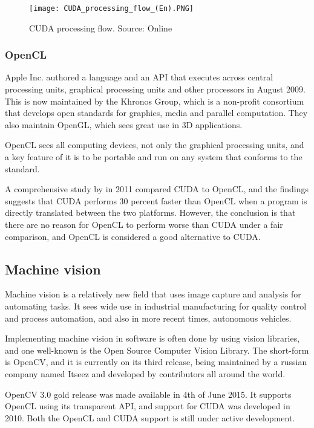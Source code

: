 \begin{figure}[ht]
    \centering
    \texttt{[image: CUDA\_processing\_flow\_(En).PNG]}
    \caption{CUDA processing flow. Source: Online \citet{wikicuda15}}
    \label{fig:CUDA_processing_flow_(En)}
\end{figure}
\FloatBarrier

\subsubsection{OpenCL}
Apple Inc. authored a language and an API that executes across central processing units, graphical processing units and other processors in August 2009. This is now maintained by the Khronos Group, which is a non-profit consortium that develops open standards for graphics, media and parallel computation. They also maintain OpenGL, which sees great use in 3D applications.

OpenCL sees all computing devices, not only the graphical processing units, and a key feature of it is to be portable and run on any system that conforms to the standard.

A comprehensive study by \citep{fang11} in 2011 compared CUDA to OpenCL, and the findings suggests that CUDA performs 30 percent faster than OpenCL when a program is directly translated between the two platforms. However, the conclusion is that there are no reason for OpenCL to perform worse than CUDA under a fair comparison, and OpenCL is considered a good alternative to CUDA.

\subsection{Machine vision}
Machine vision is a relatively new field that uses image capture and analysis for automating tasks. It sees wide use in industrial manufacturing for quality control and process automation, and also in more recent times, autonomous vehicles.

Implementing machine vision in software is often done by using vision libraries, and one well-known is the Open Source Computer Vision Library. The short-form is OpenCV, and it is currently on its third release, being maintained by a russian company named Itseez and developed by contributors all around the world.

OpenCV 3.0 gold release was made available in 4th of June 2015. It supports OpenCL using its transparent API, and support for CUDA was developed in 2010. Both the OpenCL and CUDA support is still under active development.

